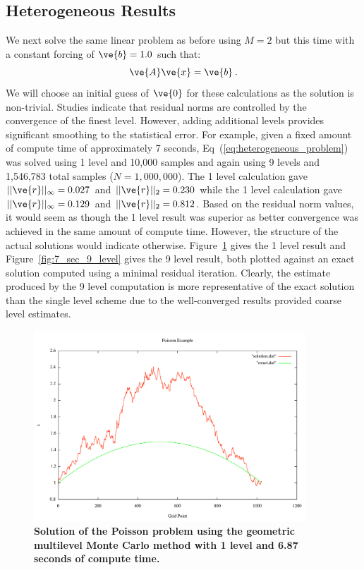 \documentclass[note]{TechNote}
\begin{document}
\subsection{Heterogeneous Results}
We next solve the same linear problem as before using $M=2$ but this
time with a constant forcing of $\ve{b}=1.0$ such that:
\begin{equation}
  \ve{A}\ve{x} = \ve{b}\:.
  \label{eq:heterogeneous_problem}
\end{equation}
We will choose an initial guess of $\ve{0}$ for these calculations as
the solution is non-trivial. Studies indicate that residual norms are
controlled by the convergence of the finest level. However, adding
additional levels provides significant smoothing to the statistical
error. For example, given a fixed amount of compute time of
approximately 7 seconds, Eq~(\ref{eq:heterogeneous_problem}) was
solved using 1 level and 10,000 samples and again using 9 levels and
1,546,783 total samples ($N=1,000,000$). The 1 level calculation gave
$||\ve{r}||_\infty = 0.027$ and $||\ve{r}||_2 = 0.230$ while the 1
level calculation gave $||\ve{r}||_\infty = 0.129$ and $||\ve{r}||_2 =
0.812$. Based on the residual norm values, it would seem as though the
1 level result was superior as better convergence was achieved in the
same amount of compute time. However, the structure of the actual
solutions would indicate otherwise. Figure~\ref{fig:7_sec_1_level}
gives the 1 level result and Figure~\ref{fig:7_sec_9_level} gives the
9 level result, both plotted against an exact solution computed using
a minimal residual iteration. Clearly, the estimate produced by the 9
level computation is more representative of the exact solution than
the single level scheme due to the well-converged results provided
coarse level estimates.
\begin{figure}[h!]
  \begin{center}
    \includegraphics[width=4in]{7_sec_1_level.pdf}
  \end{center}
  \caption{\textbf{Solution of the Poisson problem using the geometric
      multilevel Monte Carlo method with 1 level and 6.87 seconds of
      compute time.}}
  \label{fig:7_sec_1_level}
\end{figure}
\end{document}
